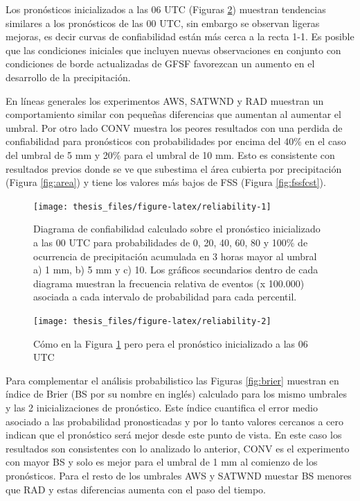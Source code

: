 \documentclass[12pt,oneside,a4paper]{reedthesis}
\begin{document}
Los pronósticos inicializados a las 06 UTC (Figuras \ref{fig:reliability-2}) muestran tendencias similares a los pronósticos de las 00 UTC, sin embargo se observan ligeras mejoras, es decir curvas de confiabilidad están más cerca a la recta 1-1. Es posible que las condiciones iniciales que incluyen nuevas observaciones en conjunto con condiciones de borde actualizadas de GFSF favorezcan un aumento en el desarrollo de la precipitación.

En líneas generales los experimentos AWS, SATWND y RAD muestran un comportamiento similar con pequeñas diferencias que aumentan al aumentar el umbral. Por otro lado CONV muestra los peores resultados con una perdida de confiabilidad para pronósticos con probabilidades por encima del 40\% en el caso del umbral de 5 mm y 20\% para el umbral de 10 mm. Esto es consistente con resultados previos donde se ve que subestima el área cubierta por precipitación (Figura \ref{fig:area}) y tiene los valores más bajos de FSS (Figura \ref{fig:fssfcst}).




\begin{figure}

{\centering \texttt{[image: thesis\_files/figure-latex/reliability-1]} 

}

\caption{Diagrama de confiabilidad calculado sobre el pronóstico inicializado a las 00 UTC para probabilidades de 0, 20, 40, 60, 80 y 100\% de ocurrencia de precipitación acumulada en 3 horas mayor al umbral a) 1 mm, b) 5 mm y c) 10. Los gráficos secundarios dentro de cada diagrama muestran la frecuencia relativa de eventos (x 100.000) asociada a cada intervalo de probabilidad para cada percentil.}\label{fig:reliability-1}
\end{figure}
\begin{figure}

{\centering \texttt{[image: thesis\_files/figure-latex/reliability-2]} 

}

\caption{Cómo en la Figura \ref{fig:reliability-1} pero pera el pronóstico inicializado a las 06 UTC}\label{fig:reliability-2}
\end{figure}
Para complementar el análisis probabilistico las Figuras \ref{fig:brier} muestran en índice de Brier (BS por su nombre en inglés) calculado para los mismo umbrales y las 2 inicializaciones de pronóstico. Este índice cuantifica el error medio asociado a las probabilidad pronosticadas y por lo tanto valores cercanos a cero indican que el pronóstico será mejor desde este punto de vista. En este caso los resultados son consistentes con lo analizado lo anterior, CONV es el experimento con mayor BS y solo es mejor para el umbral de 1 mm al comienzo de los pronósticos. Para el resto de los umbrales AWS y SATWND muestar BS menores que RAD y estas diferencias aumenta con el paso del tiempo.
\end{document}

